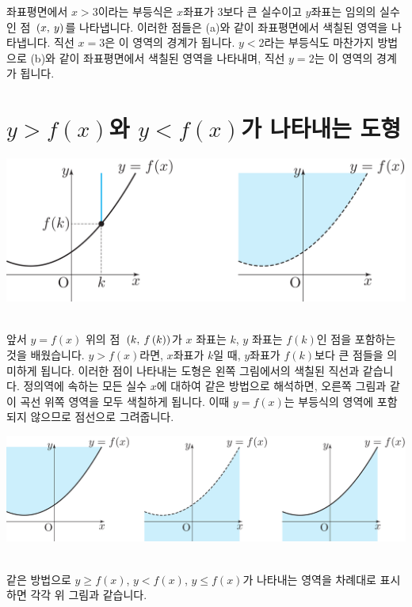 좌표평면에서 $x>3$이라는 부등식은 $x$좌표가 $3$보다 큰 실수이고 $y$좌표는 임의의 실수인 점 $\mathrm{}\left(x,\:y\right)$를 나타냅니다. 이러한 점들은 (a)와 같이 좌표평면에서 색칠된 영역을 나타냅니다. 직선 $x=3$은 이 영역의 경계가 됩니다. $y<2$라는 부등식도 마찬가지 방법으로 (b)와 같이 좌표평면에서 색칠된 영역을 나타내며, 직선 $y=2$는 이 영역의 경계가 됩니다.

\section{$y>f\left( x \right) $와 $y<f\left( x \right) $가 나타내는 도형}
\begin{center} \includegraphics[scale=\pgfkeysvalueof{picsize}]{DBs/pic/zery_07.pdf}\
	\end{center}앞서 $y=f\left( x \right) $ 위의 점 $\mathrm{}\left(k,\:f\left( k \right) \right)$가 $x$ 좌표는 $k$, $y$ 좌표는 $f\left( k \right) $인 점을 포함하는 것을 배웠습니다. $y>f\left( x \right) $라면, $x$좌표가 $k$일 때, $y$좌표가 $f\left( k \right) $보다 큰 점들을 의미하게 됩니다. 이러한 점이 나타내는 도형은 왼쪽 그림에서의 색칠된 직선과 같습니다. 정의역에 속하는 모든 실수 $x$에 대하여 같은 방법으로 해석하면, 오른쪽 그림과 같이 곡선 위쪽 영역을 모두 색칠하게 됩니다. 이때 $y=f\left( x \right) $는 부등식의 영역에 포함되지 않으므로 점선으로 그려줍니다. 
\begin{center} \includegraphics[scale=\pgfkeysvalueof{picsize}]{DBs/pic/zery_07_1.pdf}\
	\end{center}같은 방법으로 $y \ge f\left( x \right) $, $y<f\left( x \right) $, $y \le f\left( x \right) $가 나타내는 영역을 차례대로 표시하면 각각 위 그림과 같습니다.

